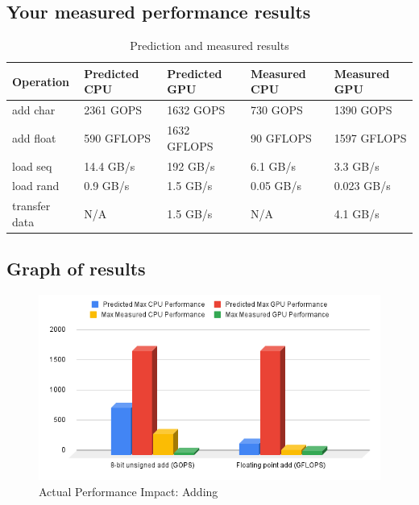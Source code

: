 \documentclass{article}
\begin{document}
\subsection{Your measured performance results}
\begin{table}[h!]
  \centering
  \begin{tabular}{lllll}
    \toprule
    Operation & Predicted CPU &  Predicted GPU & Measured CPU & Measured GPU \\
    \midrule
    add char & 2361 GOPS & 1632 GOPS & 730 GOPS & 1390 GOPS \\
    add float & 590 GFLOPS & 1632 GFLOPS & 90 GFLOPS & 1597 GFLOPS \\
    load seq & 14.4 GB/s & 192 GB/s & 6.1 GB/s & 3.3 GB/s \\
    load rand & 0.9 GB/s & 1.5 GB/s & 0.05 GB/s & 0.023 GB/s \\
    transfer data & N/A & 1.5 GB/s & N/A & 4.1 GB/s \\
    \bottomrule
  \end{tabular}
  \caption{Prediction and measured results}
  \label{tab:pnm}
\end{table}

\subsection{Graph of results}

\begin{figure}[h!t]
  \centering \includegraphics[width=1\textwidth]{add.png}
  \caption{Actual Performance Impact: Adding}
  \label{fig:add}
\end{figure}
\end{document}
